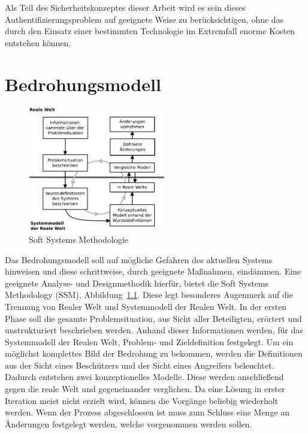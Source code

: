 \documentclass[11pt,a4paper]{report}
\begin{document}
Als Teil des Sicherheitskonzeptes dieser Arbeit wird es sein dieses Authentifizierungsproblem auf geeignete Weise zu berücksichtigen, ohne das durch den Einsatz einer bestimmten Technologie im Extremfall enorme Kosten entstehen können. 


\chapter{Bedrohungsmodell} \label{chap:threat}

\begin{figure}
\centering
\includegraphics[width=6cm]{images/ssm.pdf}
\caption{Soft Systems Methodologie}
\label{fig:ssm}
\end{figure}

Das Bedrohungsmodell soll auf mögliche Gefahren des aktuellen Systems hinweisen und diese schrittweise, durch geeignete Maßnahmen, eindämmen. Eine geeignete Analyse- und Designmethodik hierfür, bietet die Soft Systems Methodology (SSM), Abbildung~\ref{fig:ssm}. Diese legt besonderes Augenmerk auf die Trennung von Realer Welt und Systemmodell der Realen Welt. In der ersten Phase soll die gesamte Problemsituation, aus Sicht aller Beteiligten, erörtert und unstrukturiert beschrieben werden. Anhand dieser Informationen werden, für das Systemmodell der Realen Welt, Problem- und Zieldefinition festgelegt. Um ein möglichst komplettes Bild der Bedrohung zu bekommen, werden die Definitionen aus der Sicht eines Beschützers und der Sicht eines Angreifers beleuchtet. Dadurch entstehen zwei konzeptionelles Modelle. Diese werden anschließend gegen die reale Welt und gegeneinander verglichen. Da eine Lösung in erster Iteration meist nicht erzielt wird, können die Vorgänge beliebig wiederholt werden. Wenn der Prozess abgeschlossen ist muss zum Schluss eine Menge an Änderungen festgelegt werden, welche vorgenommen werden sollen.
\end{document}
